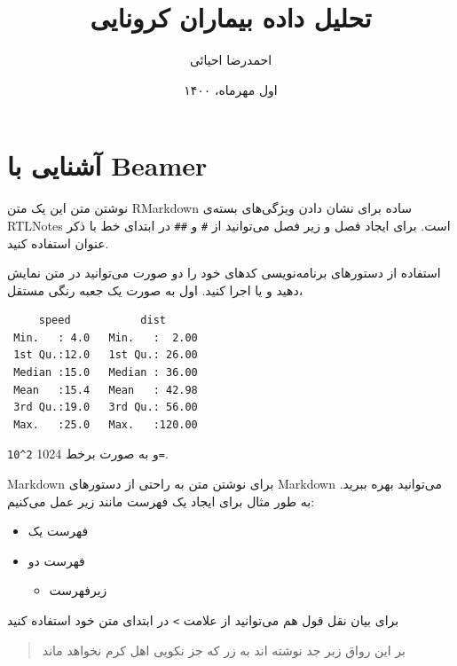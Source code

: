 \documentclass[10pt,ignorenonframetext,]{beamer}
\title{تحلیل داده بیماران کرونایی}
\author{احمدرضا احیائی}
\date{اول مهرماه، ۱۴۰۰}
\providecommand{\tightlist}{%
  \setlength{\itemsep}{0pt}\setlength{\parskip}{0pt}}
\begin{document}
\frame{\titlepage}

\hypertarget{ux622ux634ux646ux627ux6ccux6cc-ux628ux627-beamer}{%
\section{آشنایی با
Beamer}\label{ux622ux634ux646ux627ux6ccux6cc-ux628ux627-beamer}}

\begin{frame}[fragile]{نوشتن متن}
\protect\hypertarget{ux646ux648ux634ux62aux646-ux645ux62aux646}{}
این یک متن RMarkdown ساده برای نشان دادن ویژگی‌های بسته‌ی RTLNotes است.
برای ایجاد فصل و زیر فصل می‌توانید از ‍‍‍‍‍‍\texttt{\#} و \texttt{\#\#}
در ابتدای خط با ذکر عنوان استفاده کنید.
\end{frame}

\begin{frame}[fragile]{استفاده از دستورهای برنامه‌نویسی}
\protect\hypertarget{ux627ux633ux62aux641ux627ux62fux647-ux627ux632-ux62fux633ux62aux648ux631ux647ux627ux6cc-ux628ux631ux646ux627ux645ux647ux646ux648ux6ccux633ux6cc}{}
کدهای خود را دو صورت می‌توانید در متن نمایش دهید و یا اجرا کنید. اول به
صورت یک جعبه رنگی مستقل،

\begin{verbatim}
     speed           dist       
 Min.   : 4.0   Min.   :  2.00  
 1st Qu.:12.0   1st Qu.: 26.00  
 Median :15.0   Median : 36.00  
 Mean   :15.4   Mean   : 42.98  
 3rd Qu.:19.0   3rd Qu.: 56.00  
 Max.   :25.0   Max.   :120.00  
\end{verbatim}

و به صورت برخط 1024 \texttt{2\^{}10=}.
\end{frame}

\begin{frame}[fragile]{Markdown}
\protect\hypertarget{markdown}{}
برای نوشتن متن به راحتی از دستورهای Markdown می‌توانید بهره ببرید. به
طور مثال برای ایجاد یک فهرست مانند زیر عمل می‌کنیم:

\begin{itemize}
\tightlist
\item
  فهرست یک
\item
  فهرست دو

  \begin{itemize}
  \tightlist
  \item
    زیرفهرست
  \end{itemize}
\end{itemize}

برای بیان نقل قول هم می‌توانید از علامت \texttt{\textgreater{}} در
ابتدای متن خود استفاده کنید

\begin{quote}
بر این رواق زبر جد نوشته اند به زر که جز نکویی اهل کرم نخواهد ماند
\end{quote}
\end{frame}
\end{document}

